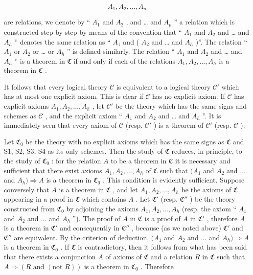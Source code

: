 \[
A _ {1}, A _ {2}, \dots , A _ {n}
\]

are relations, we denote by `` \(A_{1}\) and \(A_{2}\) , and \ldots{} and \(A_{p}\) '' a relation which is constructed step by step by means of the convention that `` \(A_{1}\) and \(A_{2}\) and \ldots{} and \(A_{h}\) '' denotes the same relation as `` \(A_{1}\) and ( \(A_{2}\) and \ldots{} and \(A_{h}\) )''. The relation `` \(A_{1}\) or \(A_{2}\) or \ldots{} or \(A_{h}\) '' is defined similarly. The relation `` \(A_{1}\) and \(A_{2}\) and \ldots{} and \(A_{h}\) '' is a theorem in \(\mathfrak{C}\) if and only if each of the relations \(A_{1}, A_{2}, \ldots, A_{h}\) is a theorem in \(\mathfrak{C}\) .

It follows that every logical theory \(\mathcal{C}\) is equivalent to a logical theory \(\mathcal{C}'\) which has at most one explicit axiom. This is clear if \(\mathcal{C}\) has no explicit axiom. If \(\mathcal{C}\) has explicit axioms \(A_{1}, A_{2}, \ldots, A_{h}\) , let \(\mathcal{C}'\) be the theory which has the same signs and schemes as \(\mathcal{C}\) , and the explicit axiom `` \(A_{1}\) and \(A_{2}\) and \ldots{} and \(A_{h}\) ''. It is immediately seen that every axiom of \(\mathcal{C}\) (resp. \(\mathcal{C}'\) ) is a theorem of \(\mathcal{C}'\) (resp. \(\mathcal{C}\) ).

Let \(\mathfrak{C}_0\) be the theory with no explicit axioms which has the same signs as \(\mathfrak{C}\) and S1, S2, S3, S4 as its only schemes. Then the study of \(\mathfrak{C}\) reduces, in principle, to the study of \(\mathfrak{C}_0\) : for the relation \(A\) to be a theorem in \(\mathfrak{C}\) it is necessary and sufficient that there exist axioms \(A_1, A_2, \ldots, A_h\) of \(\mathfrak{C}\) such that \((A_1\) and \(A_2\) and \(\ldots\) and \(A_h) \Longrightarrow A\) is a theorem in \(\mathfrak{C}_0\) . This condition is evidently sufficient. Suppose conversely that \(A\) is a theorem in \(\mathfrak{C}\) , and let \(A_1, A_2, \ldots, A_h\) be the axioms of \(\mathfrak{C}\) appearing in a proof in \(\mathfrak{C}\) which contains \(A\) . Let \(\mathfrak{C}'\) (resp. \(\mathfrak{C}''\) ) be the theory constructed from \(\mathfrak{C}_0\) by adjoining the axioms \(A_1, A_2, \ldots, A_h\) (resp. the axiom `` \(A_1\) and \(A_2\) and \(\ldots\) and \(A_h\) ''). The proof of \(A\) in \(\mathfrak{C}\) is a proof of \(A\) in \(\mathfrak{C}'\) , therefore \(A\) is a theorem in \(\mathfrak{C}'\) and consequently in \(\mathfrak{C}''\) , because (as we noted above) \(\mathfrak{C}'\) and \(\mathfrak{C}''\) are equivalent. By the criterion of deduction, \((A_1\) and \(A_2\) and \(\ldots\) and \(A_h) \Longrightarrow A\) is a theorem in \(\mathfrak{C}_0\) . If \(\mathfrak{C}\) is contradictory, then it follows from what has been said that there exists a conjunction \(A\) of axioms of \(\mathfrak{C}\) and a relation \(R\) in \(\mathfrak{C}\) such that \(A \Longrightarrow (R \text{ and } (\text{not } R))\) is a theorem in \(\mathfrak{C}_0\) . Therefore

